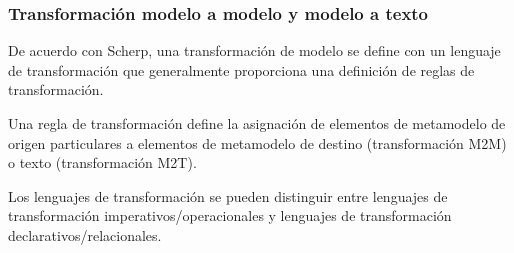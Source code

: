 \subsubsection{Transformación modelo a modelo y modelo a texto}


De acuerdo con Scherp\cite{scherp_framework_2013}, una transformación de modelo se define con un lenguaje de transformación que generalmente proporciona una definición de reglas de transformación.

Una regla de transformación define la asignación de elementos de metamodelo de origen particulares a elementos de metamodelo de destino (transformación M2M) o texto (transformación M2T).

Los lenguajes de transformación se pueden distinguir entre lenguajes de transformación imperativos/operacionales y lenguajes de transformación declarativos/relacionales.


